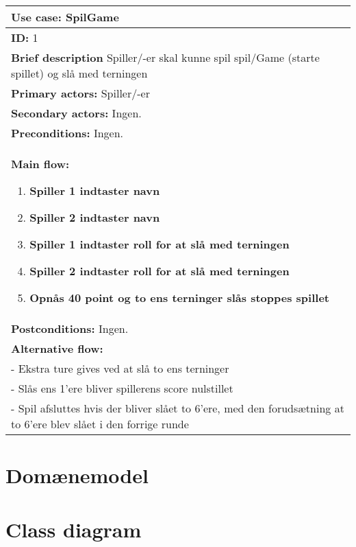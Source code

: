 \begin{center}
    \begin{tabular}{ | p{15cm} |}
    \hline
    \textbf{Use case:} SpilGame \\ \hline
    \textbf{ID:} 1 \\ \hline
    \textbf{Brief description} Spiller/-er skal kunne spil spil/Game (starte spillet) og slå med terningen     \\ \hline
    \textbf{Primary actors:} Spiller/-er \\ \hline
    \textbf{Secondary actors:} Ingen. \\ \hline
    \textbf{Preconditions:} Ingen.     \\ \hline
    \textbf{Main flow:}
    \begin{enumerate}
        \item \textbf{Spiller 1 indtaster navn}
        \item \textbf{Spiller 2 indtaster navn}
        \item \textbf{Spiller 1 indtaster roll for at slå med terningen}
        \item \textbf{Spiller 2 indtaster roll for at slå med terningen}
        \item \textbf{Opnås 40 point og to ens terninger slås stoppes spillet}    
    \end{enumerate} \\ \hline
    \textbf{Postconditions:} Ingen.\\ \hline
    \textbf{Alternative flow:}
    \\- Ekstra ture gives ved at slå to ens terninger
    \\- Slås ens 1’ere bliver spillerens score nulstillet
    \\- Spil afsluttes hvis der bliver slået to 6’ere, med den forudsætning at to 6’ere blev slået i den forrige runde  \\ \hline
    \hline
    \end{tabular}
\end{center}

\section{Domænemodel}

\section{Class diagram}